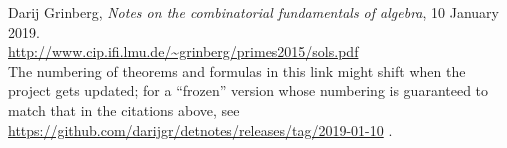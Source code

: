 \documentclass[paper=a4, fontsize=12pt]{scrartcl} %
\theoremstyle{plainsl}
\theoremstyle{definition}
\theoremstyle{remark}
\begin{document}
\begin{thebibliography}{99999999}                                                                                         %


Darij Grinberg,
\textit{Notes on the combinatorial fundamentals of algebra},
10 January 2019. \\
\url{http://www.cip.ifi.lmu.de/~grinberg/primes2015/sols.pdf}
\\
The numbering of theorems and formulas in this link might shift
when the project gets updated; for a ``frozen'' version whose
numbering is guaranteed to match that in the citations above, see
\url{https://github.com/darijgr/detnotes/releases/tag/2019-01-10} .

\end{thebibliography}
\end{document}
